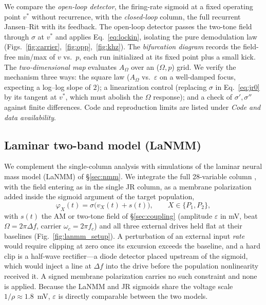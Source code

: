 \documentclass[11pt,a4paper]{article}
\newcommand{\Sig}{\sigma}
\begin{document}
We compare the \emph{open-loop detector}, the firing-rate sigmoid at a fixed
operating point $v^*$ without recurrence, with the \emph{closed-loop} column, the full recurrent
Jansen--Rit with its feedback. The open-loop detector passes the two-tone field through
$\Sig$ at $v^*$ and applies Eq.~\eqref{eq:lockin}, isolating the pure demodulation law
(Figs.~\ref{fig:carrier},~\ref{fig:opp},~\ref{fig:khz}). The \emph{bifurcation
diagram} records the field-free min/max of $v$ vs.\ $p$, each run initialized at
its fixed point plus a small kick. The \emph{two-dimensional map} evaluates
$A_\Omega$ over an ($\Omega,p$) grid. We verify the mechanism three ways: the
square law ($A_\Omega$ vs.\ $\varepsilon$ on a well-damped focus, expecting a
log--log slope of $2$); a linearization control (replacing $\Sig$ in
Eq.~\eqref{eq:jr0} by its tangent at $v^*$, which must abolish the $\Omega$
response); and a check of $\Sig',\Sig''$ against finite differences. Code and reproduction limits are listed under \emph{Code and data availability}.

\subsection{Laminar two-band model (LaNMM)}
We complement the single-column analysis with simulations of the laminar neural
mass model (LaNMM) of \S\ref{sec:nmm}. We integrate the full 28-variable column
\cite{ruffini2025cfc,sanchezTodo2023}, with the field entering as in the single
JR column, as a membrane polarization added inside the sigmoid argument of the target
population,
\begin{equation}
\varphi_X(t)=\Sig\!\big(v_X(t)+s(t)\big),\qquad X\in\{P_1,P_2\},
\label{eq:lanmm_drive}
\end{equation}
with $s(t)$ the AM or two-tone field of \S\ref{sec:coupling} (amplitude $\varepsilon$ in
mV, beat $\Omega=2\pi\Delta f$, carrier $\omega_c=2\pi f_c$) and all three external drives
held flat at their baselines (Fig.~\ref{fig:lanmm_setup}). A perturbation of an external
input \emph{rate} would require clipping at zero
once its excursion exceeds the baseline, and a hard clip is a half-wave rectifier---a
diode detector placed upstream of the sigmoid, which would inject a line at $\Delta f$
into the drive before the population nonlinearity received it. A signed membrane
polarization carries no such constraint and none is applied. Because the LaNMM and JR
sigmoids share the voltage scale $1/\rho\approx1.8$~mV, $\varepsilon$ is directly
comparable between the two models.
\end{document}
